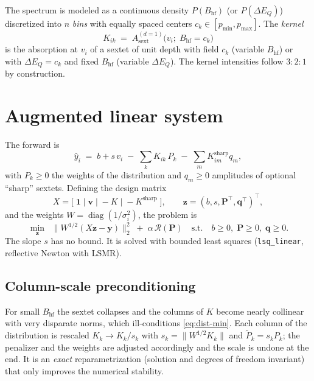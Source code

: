 \documentclass[11pt,a4paper]{article}
\newcommand{\BHF}{B_{\mathrm{hf}}}
\newcommand{\dEQ}{\Delta E_{Q}}
\newcommand{\code}[1]{\texttt{\small #1}}
\DeclareMathOperator{\diag}{diag}
\begin{document}
The spectrum is modeled as a continuous density $P(\BHF)$ (or $P(\dEQ)$)
discretized into $n$ \emph{bins} with equally spaced centers
$c_k\in[p_{\min},p_{\max}]$. The \emph{kernel}
\begin{equation}
  K_{ik} \;=\; A_{\text{sext}}^{(d=1)}\bigl(v_i;\;\BHF=c_k\bigr)
\end{equation}
is the absorption at $v_i$ of a sextet of unit depth with field $c_k$
(variable $\BHF$) or with $\dEQ=c_k$ and fixed $\BHF$ (variable $\dEQ$). The
kernel intensities follow $3{:}2{:}1$ by construction.

\section{Augmented linear system}\label{sec:dist-system}

The forward is
\begin{equation}
  \hat y_i \;=\; b + s\,v_i \;-\; \sum_{k}K_{ik}\,P_k \;-\;\sum_{m}K^{\text{sharp}}_{im}q_m,
\end{equation}
with $P_k\ge0$ the weights of the distribution and $q_m\ge0$ amplitudes of optional
``sharp'' sextets. Defining the design matrix
\begin{equation}
  X = \bigl[\;\bm 1\;\big|\;\bm v\;\big|\;{-}K\;\big|\;{-}K^{\text{sharp}}\;\bigr],
  \qquad \bm z=(b,s,\bm P^\top,\bm q^\top)^\top,
\end{equation}
and the weights $W=\diag(1/\sigma_i^2)$, the problem is
\begin{equation}
  \boxed{\;
  \min_{\bm z}\;\;\bigl\|W^{1/2}(X\bm z-\bm y)\bigr\|_2^2 \;+\; \alpha\,\mathcal R(\bm P)
  \quad\text{s.t.}\quad b\ge0,\;\bm P\ge0,\;\bm q\ge0.\;}
  \label{eq:dist-min}
\end{equation}
The slope $s$ has no bound. It is solved with bounded least squares
(\code{lsq\_linear}, reflective Newton with LSMR).

\subsection{Column-scale preconditioning}\label{sec:cond}
For small $\BHF$ the sextet collapses and the columns of $K$ become nearly
collinear with very disparate norms, which ill-conditions \eqref{eq:dist-min}.
Each column of the distribution is rescaled $K_k\to K_k/s_k$ with
$s_k=\lVert W^{1/2}K_k\rVert$ and $\tilde P_k=s_k P_k$; the penalizer and the weights
are adjusted accordingly and the scale is undone at the end. It is an
\emph{exact} reparametrization (solution and degrees of freedom invariant) that
only improves the numerical stability.
\end{document}
